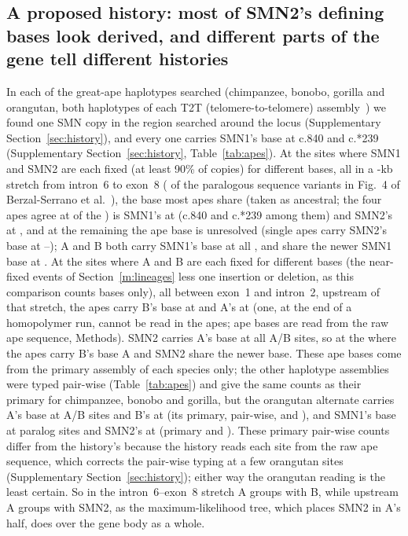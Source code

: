 \documentclass[10pt]{article}
\begin{document}
\subsection{A proposed history: most of SMN2's defining bases look derived, and different parts of the gene tell different histories}\label{m:hist}
In each of the \apeHaps{} great-ape haplotypes searched (chimpanzee, bonobo, gorilla and orangutan, both haplotypes of
each T2T (telomere-to-telomere) assembly~\cite{yoo2025}) we found one SMN copy in the region searched around the locus (Supplementary Section~\ref{sec:history}), and every one carries SMN1's base at c.840 and c.*239
(Supplementary Section~\ref{sec:history}, Table~\ref{tab:apes}). At the \evS{} sites where SMN1 and SMN2 are each
fixed (at least 90\% of copies) for different bases, all in a \evSspanKb-kb stretch from intron~6 to exon~8 (\bzMatch{} of the \bzPsvN{} paralogous sequence variants in Fig.~4 of Berzal-Serrano et al.~\cite{berzal2026}), the base most apes share (taken as ancestral; the four apes agree at \evSunan{} of the \evS) is
SMN1's at \evSancOne{} (c.840 and c.*239 among them) and SMN2's at \evSancTwo{}, and at the remaining \evSunres{} the ape base is unresolved (single apes carry SMN2's base at \evTwoBaseMin--\evTwoBaseMax); A and B both carry SMN1's
base at all \evS, and share the newer SMN1 base at \evSsharedAB. At the \evAB{} sites where A and B are each fixed for
different bases (the \abNearFixed{} near-fixed events of Section~\ref{m:lineages} less one insertion or deletion, as this comparison
counts bases only), all between exon~1 and intron~2, upstream of that stretch, the apes carry B's base at \evABancB{} and A's at
\evABancA{} (one, at the end of a homopolymer run, cannot be read in the apes; ape bases are read from the raw ape sequence, Methods). SMN2 carries A's base at all \evABtwoEqA{} A/B sites, so at the \evABancB{} where the apes carry B's base A and SMN2 share the newer base. These ape bases come from the primary assembly of each species only; the other haplotype assemblies were typed pair-wise (Table~\ref{tab:apes}) and give the same counts as their primary for chimpanzee, bonobo and gorilla, but the orangutan alternate carries A's base at \apeAltOrangA{} A/B sites and B's at \apeAltOrangB{} (its primary, pair-wise, \apeOrangPairA{} and \apeOrangPairB), and SMN1's base at \apeAltOrangSOne{} paralog sites and SMN2's at \apeAltOrangSTwo{} (primary \apeOrangPairSOne{} and \apeOrangPairSTwo). These primary pair-wise counts differ from the history's because the history reads each site from the raw ape sequence, which corrects the pair-wise typing at a few orangutan sites (Supplementary Section~\ref{sec:history}); either way the orangutan reading is the least certain. So in the intron~6--exon~8 stretch A groups
with B, while upstream A groups with SMN2, as the maximum-likelihood tree, which places SMN2 in A's half, does over the
gene body as a whole.
\end{document}
